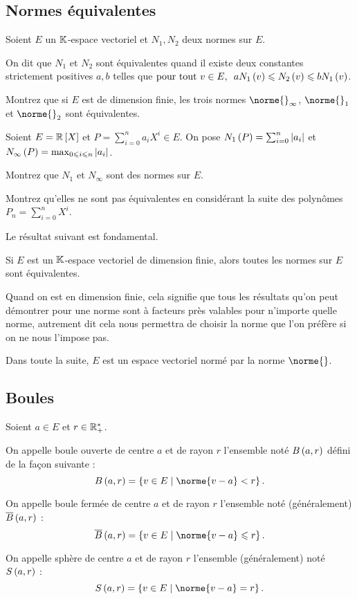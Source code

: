 \subsection{Normes équivalentes}

\begin{defi}
Soient \(E\) un \(\mathbb{K}\)-espace vectoriel et \(N_1,N_2\) deux normes sur \(E\).

On dit que \(N_1\) et \(N_2\) sont équivalentes quand il existe deux constantes strictement positives \(a,b\) telles que \(\quantifs{\tpt v\in E}aN_1\paren{v}\leq N_2\paren{v}\leq bN_1\paren{v}\).
\end{defi}

\begin{exo}
Montrez que si \(E\) est de dimension finie, les trois normes \(\norme{}_\infty\), \(\norme{}_1\) et \(\norme{}_2\) sont équivalentes.
\end{exo}

\begin{exo}
Soient \(E=\poly[\R]\) et \(P=\sum_{i=0}^na_iX^i\in E\). On pose \(N_1\left(P\right)=\sum_{i=0}^n\left\lvert a_i\right\rvert\) et \(N_\infty\left(P\right)=\max_{0\leqslant i\leqslant n}\left\lvert a_i\right\rvert\).

Montrez que \(N_1\) et \(N_\infty\) sont des normes sur \(E\).

Montrez qu'elles ne sont pas équivalentes en considérant la suite des polynômes \(P_n=\sum_{i=0}^nX^i\).
\end{exo}

Le résultat suivant est fondamental.

\begin{theo}
Si \(E\) est un \(\mathbb{K}\)-espace vectoriel de dimension finie, alors toutes les normes sur \(E\) sont équivalentes.
\end{theo}

Quand on est en dimension finie, cela signifie que tous les résultats qu'on peut démontrer pour une norme sont à facteurs près valables pour n'importe quelle norme, autrement dit cela nous permettra de choisir la norme que l'on préfère si on ne nous l'impose pas.

Dans toute la suite, \(E\) est un espace vectoriel normé par la norme \(\norme{}\).

\subsection{Boules}

\begin{defi}
Soient \(a\in E\) et \(r\in\mathbb{R}_+^*\).

On appelle boule ouverte de centre \(a\) et de rayon \(r\) l'ensemble noté \(B\left(a,r\right)\) défini de la façon suivante : \[\bouleo{a}{r}=\accol{v\in E\tq\norme{v-a}<r}.\]

On appelle boule fermée de centre \(a\) et de rayon \(r\) l'ensemble noté (généralement) \(\overline{B}\left(a,r\right)\) : \[\boulef{a}{r}=\accol{v\in E\tq\norme{v-a}\leq r}.\]

On appelle sphère de centre \(a\) et de rayon \(r\) l'ensemble (généralement) noté \(S\left(a,r\right)\) : \[\sphere{a}{r}=\accol{v\in E\tq\norme{v-a}=r}.\]
\end{defi}

